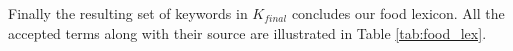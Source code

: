 Finally the resulting set of keywords in $K_{final}$ concludes our food lexicon. All the accepted terms along with their source are illustrated in Table \ref{tab:food_lex}. 

